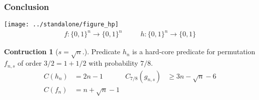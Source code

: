 \documentclass[mathserif,serif]{beamer} %
\theoremstyle{definition}
\newtheorem{construction}{Contruction}
\begin{document}
\begin{frame}
  \frametitle{Conclusion}
  {
    \centering
    \texttt{[image: ../standalone/figure\_hp]}
    \[
    \begin{aligned}
    f : \{0, 1\}^n \to \{0, 1\}^n
    & \quad &
    h : \{0, 1\}^n \to \{0, 1\}
    \end{aligned}
    \]
  }
  \begin{construction}[$s = \sqrt{n}$.]
  Predicate $h_n$ is a hard-core predicate for permutation $f_{n, s}$ of order
  $3/2 = 1 + 1/2$ with probability $7/8$.
  \[
  \begin{aligned}
  C(h_n) &= 2n - 1 & C_{7/8}(g_{n, s}) &\geq 3n - \sqrt{n} - 6 \\
  C(f_n) &= n + \sqrt{n} - 1 \\
  \end{aligned}
  \]
  \end{construction}
\end{frame}
\end{document}
